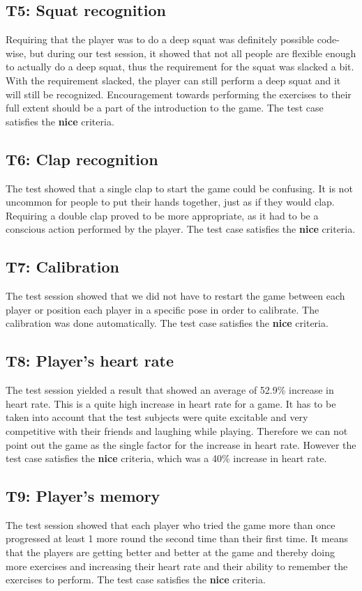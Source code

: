 \documentclass[11pt]{report}
\begin{document}
\subsection*{T5: Squat recognition}
Requiring that the player was to do a deep squat was definitely possible code-wise, but during our test session, it showed that not all people are flexible enough to actually do a deep squat, thus the requirement for the squat was slacked a bit. With the requirement slacked, the player can still perform a deep squat and it will still be recognized. Encouragement towards performing the exercises to their full extent should be a part of the introduction to the game. The test case satisfies the \textbf{nice} criteria.

\subsection*{T6: Clap recognition}
The test showed that a single clap to start the game could be confusing. It is not uncommon for people to put their hands together, just as if they would clap. Requiring a double clap proved to be more appropriate, as it had to be a conscious action performed by the player. The test case satisfies the \textbf{nice} criteria.

\subsection*{T7: Calibration}
The test session showed that we did not have to restart the game between each player or position each player in a specific pose in order to calibrate. The calibration was done automatically. The test case satisfies the \textbf{nice} criteria.

\subsection*{T8: Player's heart rate}
The test session yielded a result that showed an average of 52.9\% increase in heart rate. This is a quite high increase in heart rate for a game. It has to be taken into account that the test subjects were quite excitable and very competitive with their friends and laughing while playing. Therefore we can not point out the game as the single factor for the increase in heart rate. However the test case satisfies the \textbf{nice} criteria, which was a 40\% increase in heart rate.

\subsection*{T9: Player's memory}
The test session showed that each player who tried the game more than once progressed at least 1 more round the second time than their first time. It means that the players are getting better and better at the game and thereby doing more exercises and increasing their heart rate and their ability to remember the exercises to perform. The test case satisfies the \textbf{nice} criteria. 
\end{document}
